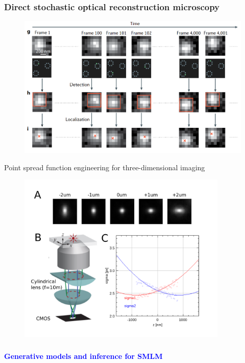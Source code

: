 \documentclass{beamer}					%
\begin{document}
\begin{frame}
\frametitle{Direct stochastic optical reconstruction microscopy}

\begin{figure}
\includegraphics[width=13cm]{Localization.png}
\end{figure}
  
\end{frame}

\begin{frame}{Point spread function engineering for three-dimensional imaging}
\begin{figure}
\includegraphics[width=10cm]{Astigmatism.png}
\end{figure}
\end{frame}



\begin{frame}
\frametitle{}
\centering
\Large \textbf{\textcolor{blue}{Generative models and inference for SMLM}}
\end{frame}
\end{document}
